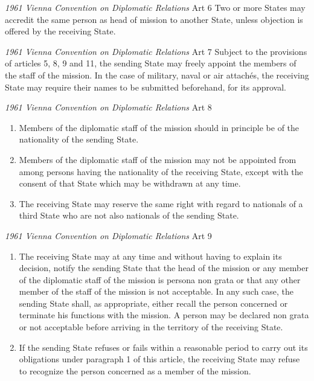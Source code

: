 \begin{conventiondetails}{\textit{1961 Vienna Convention on Diplomatic Relations} Art 6}
    \flushleft
    Two or more States may accredit the same person as head of mission to another State, unless objection is offered by the receiving State.
\end{conventiondetails}

\begin{conventiondetails}{\textit{1961 Vienna Convention on Diplomatic Relations} Art 7}
    \flushleft
    Subject to the provisions of articles 5, 8, 9 and 11, the sending State may freely appoint the members of the staff of the mission. In the case of military, naval or air attachés, the receiving State may require their names to be submitted beforehand, for its approval.
\end{conventiondetails}

\begin{conventiondetails}{\textit{1961 Vienna Convention on Diplomatic Relations} Art 8}
    \flushleft
    \begin{enumerate}
        \item Members of the diplomatic staff of the mission should in principle be of the nationality of the sending State.
        \item Members of the diplomatic staff of the mission may not be appointed from among persons having the nationality of the receiving State, except with the consent of that State which may be withdrawn at any time.
        \item The receiving State may reserve the same right with regard to nationals of a third State who are not also nationals of the sending State.
    \end{enumerate}
\end{conventiondetails}

\begin{conventiondetails}{\textit{1961 Vienna Convention on Diplomatic Relations} Art 9}
    \flushleft
    \begin{enumerate}
        \item The receiving State may at any time and without having to explain its decision, notify the sending State that the head of the mission or any member of the diplomatic staff of the mission is persona non grata or that any other member of the staff of the mission is not acceptable. In any such case, the sending State shall, as appropriate, either recall the person concerned or terminate his functions with the mission. A person may be declared non grata or not acceptable before arriving in the territory of the receiving State.
        \item If the sending State refuses or fails within a reasonable period to carry out its obligations under paragraph 1 of this article, the receiving State may refuse to recognize the person concerned as a member of the mission.
    \end{enumerate}
\end{conventiondetails}

